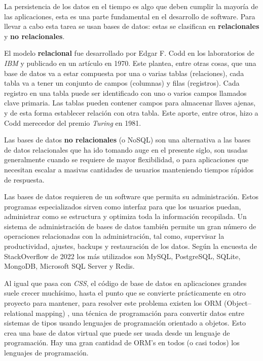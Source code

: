 La persistencia de los datos en el tiempo es algo que deben cumplir la mayoría de las aplicaciones, esta es una parte fundamental en el desarrollo de software. Para llevar a cabo esta tarea se usan bases de datos: estas se clasifican en \textbf{relacionales} y \textbf{no relacionales}.
\newline

El modelo \textbf{relacional} \cite{bd_relational} fue desarrollado por Edgar F. Codd en los laboratorios de \textit{IBM} y publicado en un artículo \cite{bd_relational} en 1970. Este plantea, entre otras cosas, que una base de datos va a estar compuesta por una o varias tablas (relaciones), cada tabla va a tener un conjunto de campos (columnas) y filas (registros). Cada registro en una tabla puede ser identificado con uno o varios campos llamados clave primaria. Las tablas pueden contener campos para almacenar llaves ajenas, y de esta forma establecer relación con otra tabla. Este aporte, entre otros, hizo a Codd merecedor del premio \textit{Turing} \cite{codd_turing} en 1981.
\newline

Las bases de datos \textbf{no relacionales} (o NoSQL) \cite{nosql} son una alternativa a las bases de datos relacionales que ha ido tomando auge en el presente siglo, son usadas generalmente cuando se requiere de mayor flexibilidad, o para aplicaciones que necesitan escalar a masivas cantidades de usuarios manteniendo tiempos rápidos de respuesta.
\newline

Las bases de datos requieren de un software que permita su administración. Estos programas especializados sirven como interfaz para que los usuarios puedan, administrar como se estructura y optimiza toda la información recopilada. Un sistema de administración de bases de datos también permite un gran número de operaciones relacionadas con la administración, tal como, supervisar la productividad, ajustes, backups y restauración de los datos. Según la encuesta de StackOverflow de 2022 \cite{encuesta2022} los más utilizados son MySQL, PostgreSQL, SQLite, MongoDB, Microsoft SQL Server y Redis.
\newline


Al igual que pasa con \textit{CSS}, el código de base de datos en aplicaciones grandes suele crecer muchísimo, hasta el punto que se convierte prácticamente en otro proyecto para mantener, para resolver este problema existen los ORM (Object–relational mapping) \cite{orm}, una técnica de programación para convertir datos entre sistemas de tipos usando lenguajes de programación orientado a objetos. Esto crea una base de datos virtual que puede ser usada desde un lenguaje de programación. Hay una gran cantidad de ORM's en todos (o casi todos) los lenguajes de programación.
\newline

